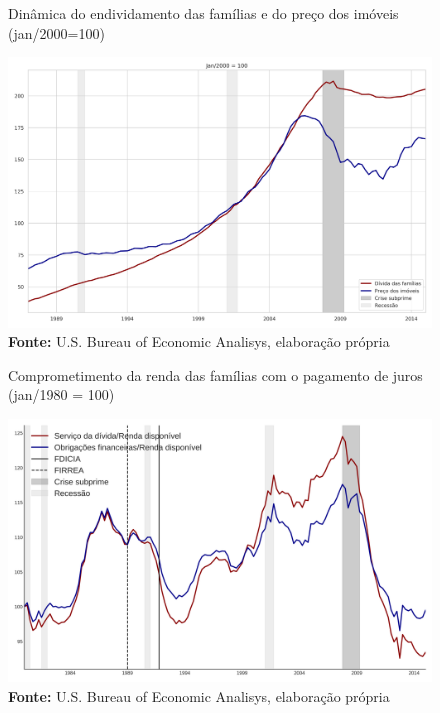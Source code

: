 \begin{figure}[H]
	\centering
	\caption{Dinâmica do endividamento das famílias e do preço dos imóveis (jan/2000=100)}
	\label{FigDividaPreco}
	\includegraphics[width=\textwidth]{../../Dados/Fatos_Estilizados/figs/Divida_PrecoImoveis.png}
	\caption*{\textbf{Fonte:} U.S. Bureau of Economic Analisys, elaboração própria}
\end{figure}

\begin{figure}[H]
	\centering
	\caption{Comprometimento da renda das famílias com o pagamento de juros (jan/1980 = 100)}
	\label{FigServDiv}
	\includegraphics[width=\textwidth]{../../Dados/Fatos_Estilizados/figs/Serv_Divida.png}
	\caption*{\textbf{Fonte:} U.S. Bureau of Economic Analisys, elaboração própria}
\end{figure}


